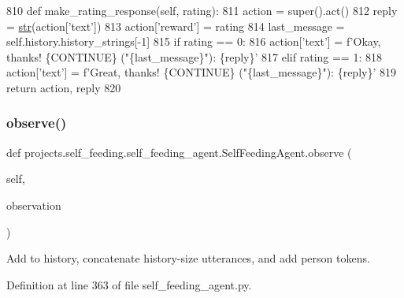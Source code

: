 \begin{DoxyCode}
810     \textcolor{keyword}{def }make\_rating\_response(self, rating):
811         action = super().act()
812         reply = \hyperlink{namespacegenerate__task__READMEs_a5b88452ffb87b78c8c85ececebafc09f}{str}(action[\textcolor{stringliteral}{'text'}])
813         action[\textcolor{stringliteral}{'reward'}] = rating
814         last\_message = self.history.history\_strings[-1]
815         \textcolor{keywordflow}{if} rating == 0:
816             action[\textcolor{stringliteral}{'text'}] = f\textcolor{stringliteral}{'Okay, thanks! \{CONTINUE\} ("\{last\_message\}"): \{reply\}'}
817         \textcolor{keywordflow}{elif} rating == 1:
818             action[\textcolor{stringliteral}{'text'}] = f\textcolor{stringliteral}{'Great, thanks! \{CONTINUE\} ("\{last\_message\}"): \{reply\}'}
819         \textcolor{keywordflow}{return} action, reply
820 
\end{DoxyCode}
\mbox{\label{classprojects_1_1self__feeding_1_1self__feeding__agent_1_1SelfFeedingAgent_a083d8cde4e9351b2f41c52a6205fe92b}} 
\subsubsection{\texorpdfstring{observe()}{observe()}}
{\footnotesize\ttfamily def projects.\+self\+\_\+feeding.\+self\+\_\+feeding\+\_\+agent.\+Self\+Feeding\+Agent.\+observe (\begin{DoxyParamCaption}\item[{}]{self,  }\item[{}]{observation }\end{DoxyParamCaption})}

\begin{DoxyVerb}Add to history, concatenate history-size utterances, and add person tokens.
\end{DoxyVerb}
 

Definition at line 363 of file self\+\_\+feeding\+\_\+agent.\+py.


